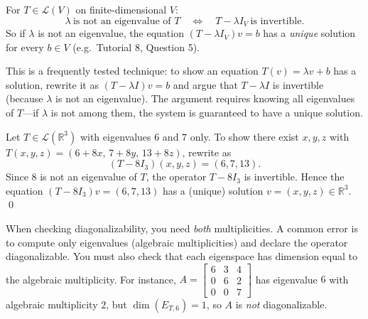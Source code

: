 \begin{examtip}[title={Exam Focus: solvability of $(T-\lambda I)v=b$}]
For $T\in\mathcal{L}(V)$ on finite-dimensional $V$:
\[
\lambda\ \text{is not an eigenvalue of }T \quad\Longleftrightarrow\quad T-\lambda I_V\ \text{is invertible}.
\]
So if $\lambda$ is not an eigenvalue, the equation $(T-\lambda I_V)v=b$ has a \emph{unique} solution for every $b\in V$
(e.g.\ Tutorial 8, Question 5).
\end{examtip}

This is a frequently tested technique: to show an equation $T(v)=\lambda v + b$ has a solution, rewrite it as $(T-\lambda I)v = b$ and argue that $T-\lambda I$ is invertible (because $\lambda$ is not an eigenvalue).
The argument requires knowing all eigenvalues of $T$---if $\lambda$ is not among them, the system is guaranteed to have a unique solution.

\begin{examplebox}[title={Worked Example (Tutorial 8, Question 5): using the spectrum to solve $T(v)=8v+b$}]
Let $T\in\mathcal{L}(\mathbb{R}^3)$ with eigenvalues $6$ and $7$ only.
To show there exist $x,y,z$ with $T(x,y,z)=(6+8x,\,7+8y,\,13+8z)$, rewrite as
\[
(T-8I_3)(x,y,z) = (6,7,13).
\]
Since $8$ is not an eigenvalue of $T$, the operator $T-8I_3$ is invertible.
Hence the equation $(T-8I_3)v=(6,7,13)$ has a (unique) solution $v=(x,y,z)\in\mathbb{R}^3$. \qed
\end{examplebox}

\begin{commonmistake}[title={Common Mistake: confusing algebraic and geometric multiplicity}]
When checking diagonalizability, you need \emph{both} multiplicities.
A common error is to compute only eigenvalues (algebraic multiplicities) and declare the operator diagonalizable.
You must also check that each eigenspace has dimension equal to the algebraic multiplicity.
For instance, $A=\begin{bmatrix}6&3&4\\0&6&2\\0&0&7\end{bmatrix}$ has eigenvalue $6$ with algebraic multiplicity $2$, but $\dim(E_{T,6})=1$, so $A$ is \emph{not} diagonalizable.
\end{commonmistake}

